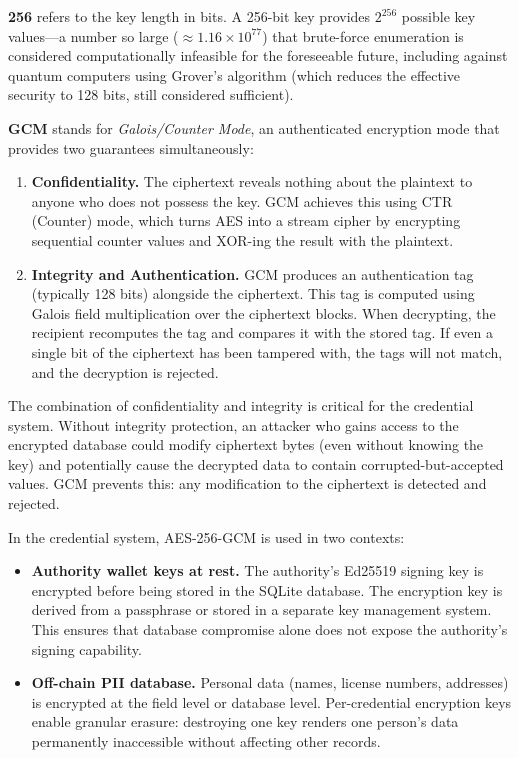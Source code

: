 \textbf{256} refers to the key length in bits.  A 256-bit key provides
$2^{256}$ possible key values---a number so large ($\approx 1.16 \times
10^{77}$) that brute-force enumeration is considered computationally
infeasible for the foreseeable future, including against quantum computers
using Grover's algorithm (which reduces the effective security to 128 bits,
still considered sufficient).

\textbf{GCM} stands for \emph{Galois/Counter Mode}, an authenticated
encryption mode that provides two guarantees simultaneously:

\begin{enumerate}[nosep]
  \item \textbf{Confidentiality.}  The ciphertext reveals nothing about the
    plaintext to anyone who does not possess the key.  GCM achieves this
    using CTR (Counter) mode, which turns AES into a stream cipher by
    encrypting sequential counter values and XOR-ing the result with the
    plaintext.
  \item \textbf{Integrity and Authentication.}  GCM produces an
    authentication tag (typically 128 bits) alongside the ciphertext.  This
    tag is computed using Galois field multiplication over the ciphertext
    blocks.  When decrypting, the recipient recomputes the tag and compares
    it with the stored tag.  If even a single bit of the ciphertext has been
    tampered with, the tags will not match, and the decryption is rejected.
\end{enumerate}

The combination of confidentiality and integrity is critical for the
credential system.  Without integrity protection, an attacker who gains
access to the encrypted database could modify ciphertext bytes (even
without knowing the key) and potentially cause the decrypted data to
contain corrupted-but-accepted values.  GCM prevents this: any modification
to the ciphertext is detected and rejected.

In the credential system, AES-256-GCM is used in two contexts:

\begin{itemize}[nosep]
  \item \textbf{Authority wallet keys at rest.}  The authority's Ed25519
    signing key is encrypted before being stored in the SQLite database.
    The encryption key is derived from a passphrase or stored in a separate
    key management system.  This ensures that database compromise alone
    does not expose the authority's signing capability.
  \item \textbf{Off-chain PII database.}  Personal data (names, license
    numbers, addresses) is encrypted at the field level or database level.
    Per-credential encryption keys enable granular erasure: destroying one
    key renders one person's data permanently inaccessible without affecting
    other records.
\end{itemize}


